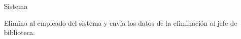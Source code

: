 \begin{PDescripcion}
\begin{enumerate}
    \end{enumerate}    
    
  \Ppaso Sistema

    \begin{enumerate}

      \Ppaso[\itarea] Elimina al empleado del sistema y envía los datos de la eliminación al jefe de biblioteca.  
    
    \end{enumerate} 
        
\end{PDescripcion}


